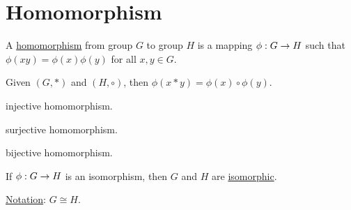 \documentclass[]{article}
\begin{document}
\section{Homomorphism}

\begin{definition}
	A \ul{homomorphism} from group $G$ to group $H$ is a mapping $\phi:G\rightarrow H$ such that $\phi(xy) = \phi(x)\phi(y)$ for all $x,y\in G$.
\end{definition}
\begin{remark}
	Given $(G,*)$ and $(H,\circ)$, then $\phi(x*y) = \phi(x)\circ\phi(y)$.
\end{remark}
\begin{definition}
	[Monomorphism] injective homomorphism.
\end{definition}
\begin{definition}
	[Epimorphism] surjective homomorphism.
\end{definition}
\begin{definition}
	[Isomorphism] bijective homomorphism.
\end{definition}
If $\phi:G\rightarrow H$ is an isomorphism, then $G$ and $H$ are \ul{isomorphic}.

\ul{Notation}: $G \cong H$.
\end{document}
